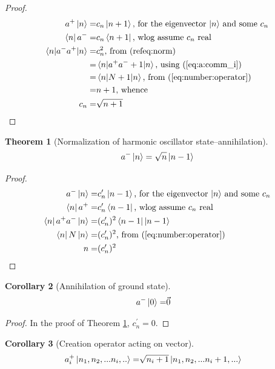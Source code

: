 \documentclass[]{article}
\newtheorem{thm}{Theorem}
\newtheorem{cor}[thm]{Corollary}
\begin{document}
\begin{proof}
	\begin{align*}
		a^+\ket{n}=&c_n\ket{n+1} \text{, for the eigenvector $\ket{n}$ and some $c_n$}\\
		\bra{n}a^-=&c_n\bra{n+1}\text{, wlog assume $c_n$ real}\\
		\braket{n|a^-a^+|n}=&c_n^2\text{, from (ref{eq:norm})}\\
		=& \braket{n|a^+a^-+1|n}\text{, using (\ref{eq:a:comm_i})}\\
		=& \braket{n|N+1|n} \text{, from (\ref{eq:number:operator})}\\
		=&n+1 \text{, whence}\\
		c_n=&\sqrt{n+1}
	\end{align*}
\end{proof}

\begin{thm}[Normalization of harmonic oscillator state--annihilation]\label{thm:norm:a-}
	\begin{align*}
		a^-\ket{n}=\sqrt{n}\ket{n-1}
	\end{align*}
\end{thm}

\begin{proof}
	\begin{align*}
		a^-\ket{n}=&c^\prime_n\ket{n-1} \text{, for the eigenvector $\ket{n}$ and some $c_n$}\\
		\bra{n}a^+=&c^\prime_n\bra{n-1} \text{, wlog assume $c_n$ real}\\
		\bra{n}a^+a^-\ket{n}=&(c^\prime_n)^2\bra{n-1}\ket{n-1}\\
		\bra{n}N\ket{n}=&(c^\prime_n)^2 \text{, from (\ref{eq:number:operator})}\\
		n=&(c^\prime_n)^2
	\end{align*}
\end{proof}

\begin{cor}[Annihilation of ground state]
	\begin{align*}
		a^-\ket{0} =& \vec{0}
	\end{align*}
\end{cor}

\begin{proof}
	In the proof of Theorem \ref{thm:norm:a-}, $c^\prime_n=0$.
\end{proof}

\begin{cor}[Creation operator acting on vector]
	\begin{align*}
		a_i^+\ket{n_1,n_2,...n_i,..}=&\sqrt{n_i+1}\ket{n_1,n_2,...n_i+1,...}
	\end{align*}
\end{cor}
\end{document}
